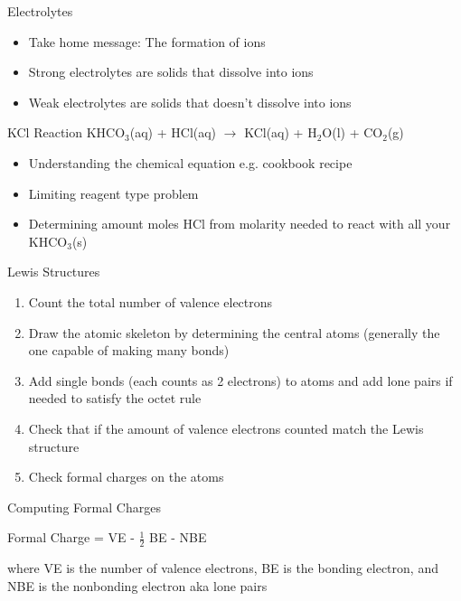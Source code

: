 \documentclass[11pt]{beamer}
\begin{document}
\begin{frame}{Electrolytes}
  \begin{itemize}
  \item Take home message: The formation of ions
  \item Strong electrolytes are solids that dissolve into
    ions
  \item Weak electrolytes are solids that doesn't dissolve into
    ions
  \end{itemize}
\end{frame}

\begin{frame}{KCl Reaction}
  KHCO$_3$(aq) + HCl(aq) $\rightarrow$ KCl(aq) + H$_2$O(l) + CO$_2$(g)

  \begin{itemize}
  \item Understanding the chemical equation e.g. cookbook recipe
  \item Limiting reagent type problem
  \item Determining amount moles HCl from molarity needed to react
    with all your KHCO$_3$(s)
  \end{itemize}
\end{frame}

\begin{frame}{Lewis Structures}
  \begin{enumerate}
  \item Count the total number of valence electrons
  \item Draw the atomic skeleton by determining the central atoms
    (generally the one capable of making many bonds)
  \item Add single bonds (each counts as 2 electrons) to atoms
    and add lone pairs if needed to satisfy the octet rule
  \item Check that if the amount of valence electrons counted match
    the Lewis structure
  \item Check formal charges on the atoms
  \end{enumerate}  
\end{frame}

\begin{frame}{Computing Formal Charges}
  \begin{center}
    Formal Charge = VE - $\frac{1}{2}$ BE - NBE
  \end{center}
  where VE is the number of valence electrons, BE is the bonding
  electron, and NBE is the nonbonding electron aka lone pairs
\end{frame}
\end{document}
